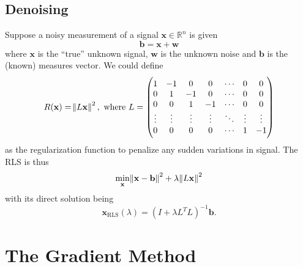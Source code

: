\documentclass[12pt]{report}
\theoremstyle{definition}
\begin{document}
\section{Denoising}

Suppose a noisy measurement of a signal $\mathbf{x}\in\mathbb{R}^{n}$ is given
\[
    \mathbf{b}=\mathbf{x}+\mathbf{w}
\]
where $\mathbf{x}$ is the ``true'' unknown signal, $\mathbf{w}$ is the unknown
noise and $\mathbf{b}$ is the (known) measures vector.
We could define
\[
    R(\mathbf{x})=\norm{L\mathbf{x}}^2, \text{ where }
    L=
    \begin{pmatrix}
        1 & -1 & 0 & 0 & \cdots & 0 & 0 \\
        0 & 1 & -1 & 0 & \cdots & 0 & 0 \\
        0 & 0 & 1 & -1 & \cdots & 0 & 0 \\
        \vdots & \vdots & \vdots & \vdots & \ddots & \vdots & \vdots \\
        0 & 0 & 0 & 0 & \cdots & 1 & -1
    \end{pmatrix} 
\]
as the regularization function to penalize any sudden variations in signal. The
RLS is thus
\[
    \underset{\mathbf{x}}{\text{min}}
    \norm{\mathbf{x}-\mathbf{b}}^2
    +\lambda\norm{L\mathbf{x}}^2
\]
with its direct solution being
\[
    \mathbf{x}_\text{RLS}(\lambda)={(I+\lambda L^TL)}^{-1}\mathbf{b}.
\]


\chapter{The Gradient Method}
\end{document}
